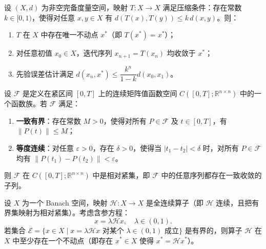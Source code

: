 \documentclass{GZUbachelorthesis}
\begin{document}
\vspace{1em}
\begin{lem}\label{lem:banach}
	设 $(X, d)$ 为非空完备度量空间，映射 $T: X \to X$ 满足压缩条件：存在常数 $k \in [0, 1)$，使得对任意 $x, y \in X$ 有 $d(T(x), T(y)) \leq k \, d(x, y)$。则：
	\begin{enumerate}
		\item $T$ 在 $X$ 中存在唯一不动点 $x^*$（即 $T(x^*) = x^*$）；
		\item 对任意初值 $x_0 \in X$，迭代序列 $x_{n+1} = T(x_n)$ 均收敛于 $x^*$；
		\item 先验误差估计满足 $d(x_n, x^*) \leq \dfrac{k^n}{1 - k} d(x_0, x_1)$。
	\end{enumerate}
\end{lem}
\vspace{1em}
\begin{lem}\label{lem:arzela}
	设 $\mathcal{F}$ 是定义在紧区间 $[0, T]$ 上的连续矩阵值函数空间 $C([0,T]; \mathbb{R}^{n \times n})$ 中的一个函数族。若 $\mathcal{F}$ 满足：
	\begin{enumerate}
		\item \textbf{一致有界}：存在常数 $M > 0$，使得对所有 $P \in \mathcal{F}$ 及 $t \in [0,T]$，有 $\|P(t)\| \le M$；
		\item \textbf{等度连续}：对任意 $\varepsilon > 0$，存在 $\delta > 0$，使得当 $|t_1 - t_2| < \delta$ 时，对所有 $P \in \mathcal{F}$ 均有 $\|P(t_1) - P(t_2)\| < \varepsilon$。
	\end{enumerate}
	则 $\mathcal{F}$ 在 $C([0,T]; \mathbb{R}^{n \times n})$ 中是相对紧集，即 $\mathcal{F}$ 中的任意序列都存在一致收敛的子列。
\end{lem}

\vspace{1em}
\begin{lem}\label{lem:schaefer}
	设 $X$ 为一个 Banach 空间，映射 $\mathcal{H}: X \to X$ 是全连续算子（即 $\mathcal{H}$ 连续，且把有界集映射为相对紧集）。考虑含参方程：
	\begin{equation}
		x = \lambda \mathcal{H}x, \quad \lambda \in (0,1).
	\end{equation}
	若集合 $\mathcal{E} = \{ x \in X \mid x = \lambda \mathcal{H}x \text{ 对某个 } \lambda \in (0,1) \text{ 成立} \}$ 是有界的，则算子 $\mathcal{H}$ 在 $X$ 中至少存在一个不动点（即存在 $x^* \in X$ 使得 $x^* = \mathcal{H}x^*$）。
\end{lem}
\end{document}
